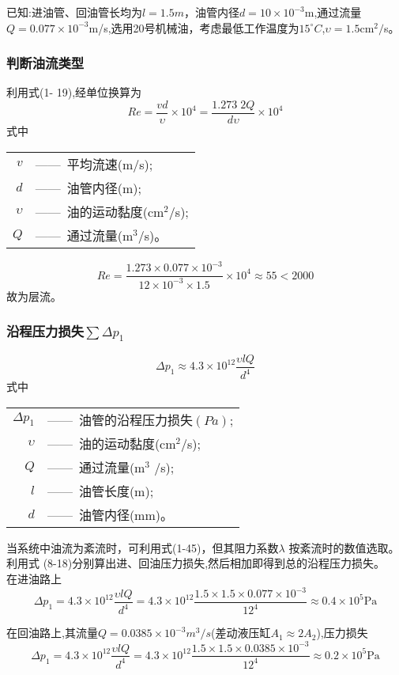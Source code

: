 已知:进油管、回油管长均为$l=1.5m$，油管内径$d=10\times 10^{-3}$m,通过流量$Q=0.077\times 10^{-3}$m/s,选用20号机械油，考虑最低工作温度为$15^{\circ}C$,$\upsilon=1.5 $cm$^2/$s。
\subsubsection*{判断油流类型}

利用式(1- 19),经单位换算为
\begin{equation}
Re=\frac{vd}{\upsilon}\times 10^4=\frac{1.273\;2Q}{d\upsilon}\times 10^4
\end{equation}
\noindent 式中\
\begin{tabular}[t]{rl}
$v$&——\ 平均流速(m/s);\\
$d$&——\ 油管内径(m);\\
$\upsilon$&——\ 油的运动黏度(cm$^2/$s);\\
$Q$&——\ 通过流量(m$^3$/s)。\\
\end{tabular}

$$
Re=\frac{1.273\times 0.077 \times 10^{-3}}{12\times10^{-3}\times 1.5}\times 10^4\approx55<2000
$$
故为层流。

\subsubsection*{沿程压力损失$\sum \Delta p_1$}
\begin{equation}
\Delta p_1\approx 4.3\times10^{12} \frac{\upsilon l Q}{d^4}
\end{equation}
\noindent 式中\
\begin{tabular}[t]{rl}
$\Delta p_1$&——\ 油管的沿程压力损失$(Pa)$;\\
$\upsilon $&——\ 油的运动黏度(cm$^2$/s);\\
$Q$&——\ 通过流量(m$^3$ /s);\\
$l$&——\ 油管长度(m);\\
$d$&——\ 油管内径(mm)。\\
\end{tabular}
当系统中油流为紊流时，可利用式(1-45)，但其阻力系数$\lambda$ 按紊流时的数值选取。利用式
(8-18)分别算出进、回油压力损失,然后相加即得到总的沿程压力损失。\\
在进油路上
$$
\Delta p_1= 4.3\times10^{12} \frac{\upsilon l Q}{d^4}=4.3\times 10^{12} \frac {1.5\times 1.5 \times 0.077 \times 10^{-3}}{12^4} \approx 0.4\times 10^5 \text{Pa}
$$

在回油路上,其流量$Q=0.0385\times 10^{-3}m^3/s$(差动液压缸$A_1\approx 2A_2$),压力损失
$$\Delta p_1= 4.3\times10^{12} \frac{\upsilon l Q}{d^4}=4.3\times 10^{12} \frac {1.5\times 1.5 \times 0.0385 \times 10^{-3}}{12^4} \approx 0.2\times 10^5 \text{Pa}$$

